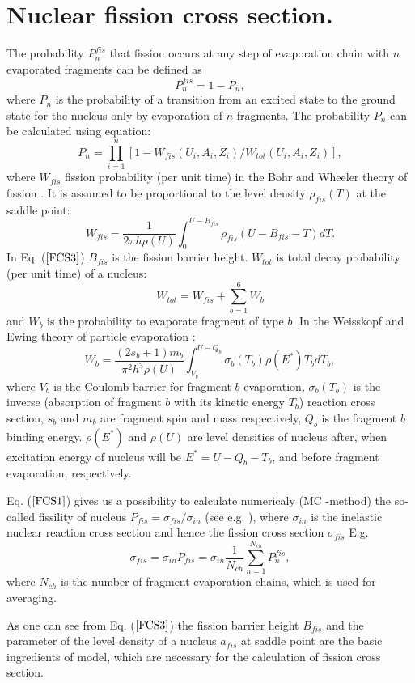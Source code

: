 \section{Nuclear fission cross section.}

\hspace{1.0em}The probability $P_{n}^{fis}$ that fission occurs at any
step of evaporation chain with $n$ evaporated fragments can be defined
as 
\begin{equation}
\label{FCS1}P_{n}^{fis} = 1-P_{n}, 
\end{equation} 
where $P_{n}$ is the probability of a transition from an excited state
to the ground state for the nucleus only by evaporation of $n$
fragments. The probability $P_{n}$ can be calculated using equation:
\begin{equation}
\label{FCS2}P_{n}=\prod_{i=1}^{n}[1-W_{fis}(U_i,A_i,Z_i)/W_{tot}(U_i,A_i,Z_i)],
\end{equation}
where $W_{fis}$ fission probability (per unit time) in the Bohr and
Wheeler theory of fission \cite{BW39}. It is assumed to be proportional
to the level density $\rho_{fis}(T)$ at the saddle point:
\begin{equation}
\label{FCS3}W_{fis}=\frac{1}{2\pi h \rho(U)}\int_{0}^{U-B_{fis}}
\rho_{fis}(U-B_{fis}-T)dT.
\end{equation}
In Eq. ($\ref{FCS3}$) $B_{fis}$ is the fission barrier height.  $W_{tot}$
is total decay probability (per unit time) of a nucleus:
\begin{equation}
\label{FCS4} W_{tot}=W_{fis}+\sum_{b=1}^{6}W_{b}
\end{equation}
and $W_{b}$ is the probability to evaporate fragment of type $b$.  In
the Weisskopf and Ewing theory of particle evaporation \cite{WE40}:
\begin{equation}
\label{FCS5}W_{b}=\frac{(2s_b + 1)m_b}{\pi^2 h^3 \rho(U)}
\int_{V_b}^{U-Q_b} 
\sigma_b(T_b)\rho(E^{*})T_bdT_b,
\end{equation}
where $V_b$ is the Coulomb barrier for fragment $b$ evaporation,
$\sigma_{b}(T_b)$ is the inverse (absorption of fragment $b$ with its kinetic 
energy $T_b$) reaction
cross section, $s_b$ and $m_b$ are fragment spin and mass respectively,
$Q_b$ is the fragment $b$ binding energy.
$\rho(E^{*})$ and $\rho(U)$ are level densities of nucleus after, when
excitation energy of nucleus will be $E^{*}=U-Q_b-T_b$, and before
fragment evaporation, respectively.  

Eq. ($\ref{FCS1}$) gives us a possibility to calculate numericaly (MC
-method) the so-called fissility of nucleus $P_{fis} =
\sigma_{fis}/\sigma_{in}$ (see e.g. \cite{ICC80}), where $\sigma_{in}$
is the inelastic nuclear reaction cross section and hence the fission
cross section $\sigma_{fis}$ E.g.
\begin{equation}
\label{FCS2} \sigma_{fis}=\sigma_{in}P_{fis}=\sigma_{in}\frac{1}{N_{ch}}
\sum_{n=1}^{N_{ch}}P^{fis}_{n},
\end{equation}
where $N_{ch}$ is the number of fragment evaporation chains, which is
used for averaging.
 
As one can see from Eq. ($\ref{FCS3}$) the fission barrier height
$B_{fis}$ and the parameter of the level density of a nucleus $a_{fis}$
at saddle point are the basic ingredients of model, which are necessary
for the calculation of fission cross section.
